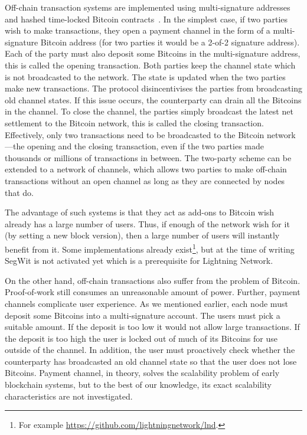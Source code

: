 Off-chain transaction systems are implemented using multi-signature addresses~\cite{bitcoinmultisig} and hashed time-locked Bitcoin contracts~\cite{bitcointimelock}.
In the simplest case, 
if two parties wish to make transactions,
they open a payment channel in the form of a multi-signature Bitcoin address (for two parties it would be a 2-of-2 signature address).
Each of the party must also deposit some Bitcoins in the multi-signature address,
this is called the opening transaction.
Both parties keep the channel state which is not broadcasted to the network.
The state is updated when the two parties make new transactions.
The protocol disincentivises the parties from broadcasting old channel states.
If this issue occurs, the counterparty can drain all the Bitcoins in the channel.
To close the channel, the parties simply broadcast the latest net settlement to the Bitcoin network,
this is called the closing transaction.
Effectively, only two transactions need to be broadcasted to the Bitcoin network---the opening and the closing transaction,
even if the two parties made thousands or millions of transactions in between.
The two-party scheme can be extended to a network of channels,
which allows two parties to make off-chain transactions without an open channel as long as they are connected by nodes that do.

The advantage of such systems is that they act as add-ons to Bitcoin wish already has a large number of users.
Thus, if enough of the network wish for it (by setting a new block version),
then a large number of users will instantly benefit from it.
Some implementations already exist\footnote{For example \url{https://github.com/lightningnetwork/lnd}.},
but at the time of writing SegWit is not activated yet which is a prerequisite for Lightning Network.

On the other hand, off-chain transactions also suffer from the problem of Bitcoin.
Proof-of-work still consumes an unreasonable amount of power.
Further, payment channels complicate user experience.
As we mentioned earlier, each node must deposit some Bitcoins into a multi-signature account.
The users must pick a suitable amount.
If the deposit is too low it would not allow large transactions.
If the deposit is too high the user is locked out of much of its Bitcoins for use outside of the channel.
In addition, the user must proactively check whether the counterparty has broadcasted an old channel state so that the user does not lose Bitcoins.
Payment channel, in theory, solves the scalability problem of early blockchain systems,
but to the best of our knowledge, its exact scalability characteristics are not investigated.

